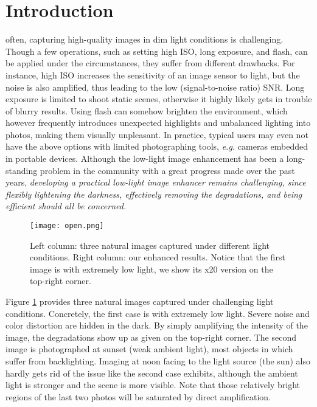 \documentclass[journal,10pt,compsoc]{IEEEtran}
\begin{document}
\IEEEpeerreviewmaketitle


\maketitle




\section{Introduction}
 often, capturing high-quality images in dim light conditions is challenging. Though a few operations, such as setting high ISO, long exposure, and flash, can be applied under the circumstances, they suffer from different drawbacks.  For instance, high ISO increases the sensitivity of an image sensor to light, but the noise is also amplified, thus leading to the low (signal-to-noise ratio) SNR. Long exposure is limited to shoot static scenes, otherwise it highly likely gets in trouble of blurry results. Using flash can somehow brighten the environment, which however frequently introduces unexpected highlights and unbalanced lighting into photos, making them visually unpleasant. In practice, typical users may even not have the above options with limited photographing tools, {\it e.g.} cameras embedded in portable devices. Although the low-light image enhancement has been a long-standing problem in the community with a great progress made over the past years, {\it developing a practical low-light image enhancer remains challenging, since flexibly lightening the darkness, effectively removing the degradations, and being efficient should all be concerned.} 




\begin{figure}[t]
	\begin{center}
			\texttt{[image: open.png]}
	\end{center}
	\caption{Left column: three natural images captured under different light conditions. Right column: our enhanced results. Notice that the first image is with extremely low light, we show its x20 version on the top-right corner.}
	\vspace{-10pt}
	\label{fig:open}
\end{figure}

Figure \ref{fig:open} provides three natural images captured under challenging light conditions. Concretely, the first case is with extremely low light. Severe noise and color distortion are hidden in the dark. By simply amplifying the intensity of the image, the degradations show up as given on the top-right corner. The second image is photographed at sunset (weak ambient light), most objects in which suffer from backlighting.  Imaging at noon facing to the light source (the sun) also hardly gets rid of the issue like the second case exhibits, although the ambient light is stronger and the scene is more visible. Note that those relatively bright regions of the last two photos will be saturated by direct amplification. 
\end{document}

